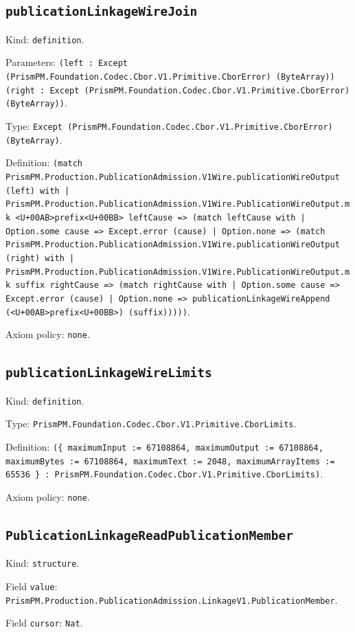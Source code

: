 \documentclass[11pt]{article}
\begin{document}
\subsection*{\texttt{publicationLinkageWireJoin}}
\noindent Kind: \texttt{definition}.\par
\noindent Parameters: \texttt{(left : Except (PrismPM.Foundation.Codec.Cbor.V1.Primitive.CborError) (ByteArray)) (right : Except (PrismPM.Foundation.Codec.Cbor.V1.Primitive.CborError) (ByteArray))}.\par
\noindent Type: \texttt{Except (PrismPM.Foundation.Codec.Cbor.V1.Primitive.CborError) (ByteArray)}.\par
\noindent Definition: \texttt{(match PrismPM.Production.PublicationAdmission.V1Wire.publicationWireOutput (left) with | PrismPM.Production.PublicationAdmission.V1Wire.PublicationWireOutput.mk <U+00AB>prefix<U+00BB> leftCause => (match leftCause with | Option.some cause => Except.error (cause) | Option.none => (match PrismPM.Production.PublicationAdmission.V1Wire.publicationWireOutput (right) with | PrismPM.Production.PublicationAdmission.V1Wire.PublicationWireOutput.mk suffix rightCause => (match rightCause with | Option.some cause => Except.error (cause) | Option.none => publicationLinkageWireAppend (<U+00AB>prefix<U+00BB>) (suffix)))))}.\par
\noindent Axiom policy: \texttt{none}.\par
\subsection*{\texttt{publicationLinkageWireLimits}}
\noindent Kind: \texttt{definition}.\par
\noindent Type: \texttt{PrismPM.Foundation.Codec.Cbor.V1.Primitive.CborLimits}.\par
\noindent Definition: \texttt{(\{ maximumInput := 67108864, maximumOutput := 67108864, maximumBytes := 67108864, maximumText := 2048, maximumArrayItems := 65536 \} : PrismPM.Foundation.Codec.Cbor.V1.Primitive.CborLimits)}.\par
\noindent Axiom policy: \texttt{none}.\par
\subsection*{\texttt{PublicationLinkageReadPublicationMember}}
\noindent Kind: \texttt{structure}.\par
\noindent Field \texttt{value}: \texttt{PrismPM.Production.PublicationAdmission.LinkageV1.PublicationMember}.\par
\noindent Field \texttt{cursor}: \texttt{Nat}.\par
\end{document}
